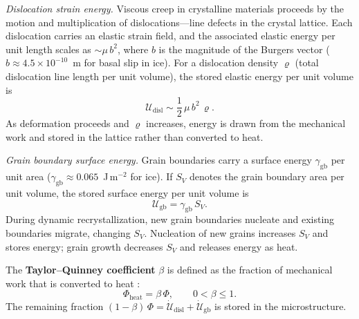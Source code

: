 \documentclass[11pt]{article}
\begin{document}
\medskip
\noindent \textit{Dislocation strain energy.}  Viscous creep in crystalline materials proceeds by the motion and multiplication of dislocations---line defects in the crystal lattice.  Each dislocation carries an elastic strain field, and the associated elastic energy per unit length scales as $\sim\!\mu\,b^2$, where $b$ is the magnitude of the Burgers vector ($b \approx 4.5 \times 10^{-10}$~m for basal slip in ice).  For a dislocation density $\varrho$ (total dislocation line length per unit volume), the stored elastic energy per unit volume is
\begin{equation}
  \mathcal{U}_{\text{disl}} \sim \frac{1}{2}\,\mu\,b^2\,\varrho.
  \label{eq:disl_energy}
\end{equation}
As deformation proceeds and $\varrho$ increases, energy is drawn from the mechanical work and stored in the lattice rather than converted to heat.

\medskip
\noindent \textit{Grain boundary surface energy.}  Grain boundaries carry a surface energy $\gamma_{\text{gb}}$ per unit area ($\gamma_{\text{gb}} \approx 0.065$~J\,m$^{-2}$ for ice).  If $S_V$ denotes the grain boundary area per unit volume, the stored surface energy per unit volume is
\begin{equation}
  \mathcal{U}_{\text{gb}} = \gamma_{\text{gb}}\,S_V.
  \label{eq:gb_energy}
\end{equation}
During dynamic recrystallization, new grain boundaries nucleate and existing boundaries migrate, changing $S_V$.  Nucleation of new grains increases $S_V$ and stores energy; grain growth decreases $S_V$ and releases energy as heat.

\medskip
\noindent The \textbf{Taylor--Quinney coefficient} $\beta$ is defined as the fraction of mechanical work that is converted to heat \cite{Ranganathanetal2021}:
\begin{equation}
  \Phi_{\text{heat}} = \beta\,\Phi, \qquad 0 < \beta \leq 1.
  \label{eq:taylor_quinney}
\end{equation}
The remaining fraction $(1 - \beta)\,\Phi = \dot{\mathcal{U}}_{\text{disl}} + \dot{\mathcal{U}}_{\text{gb}}$ is stored in the microstructure.
\end{document}
